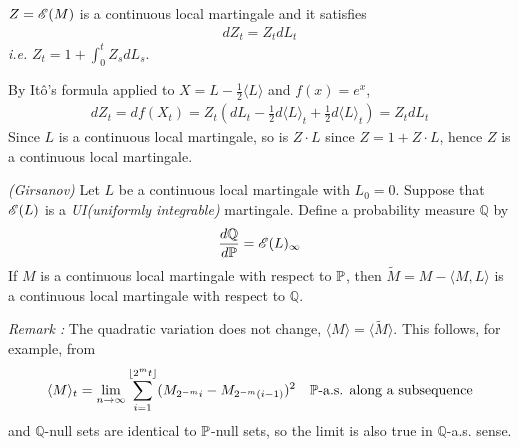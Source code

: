 \documentclass[12pt,a4paper]{article}
\newenvironment{proof}
{\begin{changemargin}{0.5cm}{0.5cm} 
	}%
	{\end{changemargin}
}
\newenvironment{p}
{\begin{proof} 
	}%
	{\end{proof}
}
\begin{document}
\fact $Z = \mathscr{E} (M)$ is a continuous local martingale and it satisfies
\begin{align*}
dZ_t = Z_t dL_t
\end{align*}
\emph{i.e.} $Z_t = 1 + \int_0^t Z_s dL_s$.
\begin{p}
\pf By It\^o's formula applied to $X = L - \frac{1}{2} \langle L \rangle$ and $f(x) = e^x$,
\begin{align*}
dZ_t = df(X_t) = Z_t (dL_t - \frac{1}{2} d\langle L \rangle_t + \frac{1}{2} d\langle L \rangle_t) = Z_t dL_t
\end{align*}
Since $L$ is a continuous local martingale, so is $Z\cdot L$ since $Z= 1+Z\cdot L$, hence $Z$ is a continuous local martingale.

\eop 
\end{p}
\s

\thm \emph{(Girsanov)} Let $L$ be a continuous local martingale with $L_0 =0$. Suppose that $\mathscr{E} (L)$ is a \emph{UI(uniformly integrable)} martingale. Define a probability measure $\mathbb{Q}$ by
\begin{align*}
\frac{d\mathbb{Q}}{d \mathbb{P}} = \mathscr{E} (L)_{\infty}
\end{align*}
If $M$ is a continuous local martingale with respect to $\mathbb{P}$, then $\tilde{M} = M - \langle M, L\rangle$ is a continuous local martingale with respect to $\mathbb{Q}$.
\s

\emph{Remark :} The quadratic variation does not change, $\langle M \rangle = \langle \tilde{M} \rangle$. This follows, for example, from
\begin{align*}
\langle M \rangle_t = \lim_{n\rightarrow \infty} \sum_{i=1}^{\lfloor 2^m t \rfloor} (M_{2^{-m}i} - M_{2^{-m}(i-1)})^2 \quad \mathbb{P}\text{-a.s. along a subsequence}
\end{align*}
and $\mathbb{Q}$-null sets are identical to $\mathbb{P}$-null sets, so the limit is also true in $\mathbb{Q}$-a.s. sense. 
\s
\end{document}
